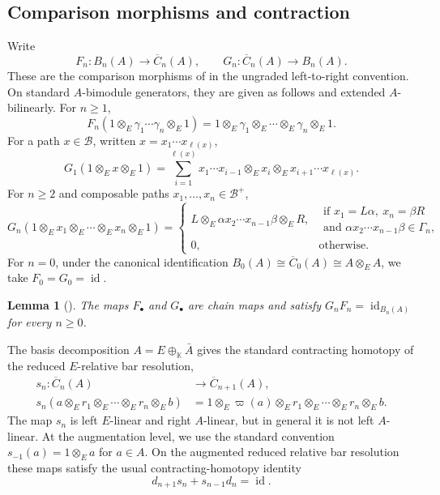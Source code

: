 \documentclass[11pt,a4paper,reqno]{amsart}
\newcommand{\mK}{\mathbb K}
\newcommand{\mB}{\mathcal B}
\newcommand{\id}{\operatorname{id}}
\theoremstyle{plain}
\newtheorem{lemma}[lemma]{Lemma}
\theoremstyle{definition}
\numberwithin{equation}{section}
\begin{document}
	\subsection{Comparison morphisms and contraction}
	
	Write
	\[
	F_n:B_n(A)\longrightarrow\overline C_n(A),\qquad
	G_n:\overline C_n(A)\longrightarrow B_n(A).
	\]
	These are the comparison morphisms of
	\cite[Propositions~2.12 and~2.13]{BSSWW26} in the ungraded left-to-right
	convention. On standard $A$-bimodule generators, they are given as follows
	and extended $A$-bilinearly.
	For $n\geq1$,
	\[
	F_n(1\otimes_E\gamma_1\cdots\gamma_n\otimes_E1)
	=1\otimes_E\gamma_1\otimes_E\cdots\otimes_E\gamma_n\otimes_E1.
	\]
	For a path $x\in\mB$, written $x=x_1\cdots x_{\ell(x)}$,
	\[
	G_1(1\otimes_E x\otimes_E1)=
	\sum_{i=1}^{\ell(x)}x_1\cdots x_{i-1}\otimes_E x_i\otimes_E x_{i+1}\cdots x_{\ell(x)}.
	\]
	For $n\geq2$ and composable paths
	$x_1,\dots,x_n\in\mB^+$,
	\[
	G_n(1\otimes_E x_1\otimes_E\cdots\otimes_E x_n\otimes_E1)
	=
	\begin{cases}
		L\otimes_E\alpha x_2\cdots x_{n-1}\beta\otimes_E R,
		& \begin{array}{l}
			\text{if } x_1=L\alpha,\ x_n=\beta R\\
			\text{and }\alpha x_2\cdots x_{n-1}\beta\in\Gamma_n,
		\end{array}\\[5mm]
		0, & \text{otherwise.}
	\end{cases}
	\]
	For $n=0$, under the canonical identification
	$B_0(A) \cong \overline C_0(A) \cong A\otimes_E A$,
	we take $F_0=G_0=\id$.
	\begin{lemma}[{\cite[Propositions~2.12 and~2.13]{BSSWW26}}]\label{lem:comparison-maps}
		The maps $F_\bullet$ and $G_\bullet$ are chain maps and satisfy $G_nF_n=\id_{B_n(A)}$ for every $n\geq0$.
	\end{lemma}
	
	
	The basis decomposition
	$A=E\oplus_{\mK}\bar A$ gives the standard contracting homotopy of the reduced
	$E$-relative bar resolution,
	\[
	\begin{aligned}
		s_n:\overline C_n(A)&\longrightarrow\overline C_{n+1}(A),\\
		s_n(a\otimes_E r_1\otimes_E\cdots\otimes_E r_n\otimes_E b)
		&=
		1\otimes_E\varpi(a)\otimes_E r_1\otimes_E\cdots\otimes_E r_n\otimes_E b.
	\end{aligned}
	\]
	The map $s_n$ is left $E$-linear and right $A$-linear, but in general it is
	not left $A$-linear. At the augmentation level, we use the standard convention
	$s_{-1}(a)=1\otimes_E a$ for $a\in A$. On the augmented reduced relative bar resolution these
	maps satisfy the usual contracting-homotopy identity
	\[
	d_{n+1}s_n+s_{n-1}d_n=\id.
	\]
	
\end{document}
